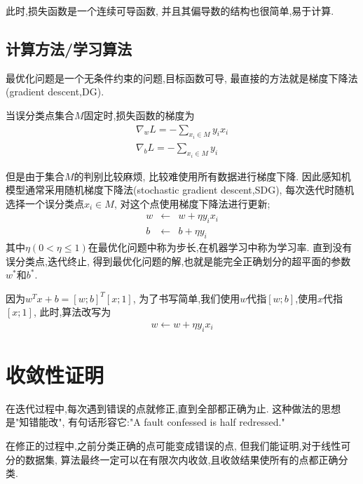 \documentclass[a4paper,12pt]{article}
\begin{document}
			此时,损失函数是一个连续可导函数,
			并且其偏导数的结构也很简单,易于计算.

        \subsection{计算方法/学习算法}
        
            最优化问题是一个无条件约束的问题,目标函数可导,
            最直接的方法就是梯度下降法(gradient descent,DG).

            当误分类点集合$M$固定时,损失函数的梯度为
            \begin{eqnarray}
                \nabla_w L = -\sum_{x_i\in M} y_i x_i  \\
                \nabla_b L = -\sum_{x_i\in M} y_i
            \end{eqnarray}

			但是由于集合$M$的判别比较麻烦,
			比较难使用所有数据进行梯度下降.
            因此感知机模型通常采用随机梯度下降法(stochastic gradient descent,SDG),
            每次迭代时随机选择一个误分类点$x_i \in M$,
            对这个点使用梯度下降法进行更新;
            \begin{eqnarray}
                w & \leftarrow & w + \eta y_i x_i \\
                b & \leftarrow & b + \eta y_i
            \end{eqnarray}
            其中$\eta(0< \eta\le 1)$在最优化问题中称为步长,在机器学习中称为学习率.
			直到没有误分类点,迭代终止,
			得到最优化问题的解,也就是能完全正确划分的超平面的参数$w^*$和$b^*$.

            因为$w^T x + b = [w;b]^T [x;1]$,
            为了书写简单,我们使用$w$代指$[w;b]$,使用$x$代指$[x;1]$,
            此时,算法改写为
            \begin{eqnarray}
                w \leftarrow w + \eta y_i x_i
            \end{eqnarray}

	\section{收敛性证明}
		\label{sec:proof}
        
		在迭代过程中,每次遇到错误的点就修正,直到全部都正确为止.
		这种做法的思想是"知错能改",
		有句话形容它:"A fault confessed is half redressed."
		
        在修正的过程中,之前分类正确的点可能变成错误的点,
		但我们能证明,对于线性可分的数据集,
		算法最终一定可以在有限次内收敛,且收敛结果使所有的点都正确分类.
\end{document}
